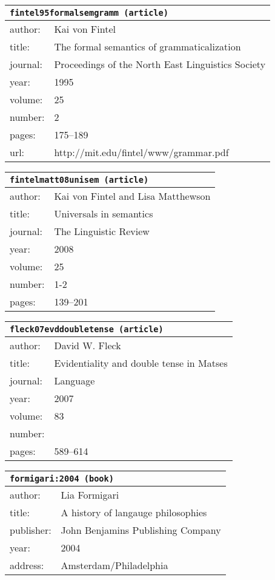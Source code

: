 \documentclass{article}
\begin{document}
\bigskip

\begin{tabular}{p{}p{}}
\multicolumn{2}{l}{\texttt{fintel95formalsemgramm (article)}}\\
\hline
author: & Kai {von Fintel}\\
title: & The formal semantics of grammaticalization\\
journal: & Proceedings of the North East Linguistics Society\\
year: & 1995\\
volume: & 25\\
number: & 2\\
pages: & 175--189\\
url: & http://mit.edu/fintel/www/grammar.pdf\\
\end{tabular}

\bigskip

\begin{tabular}{p{}p{}}
\multicolumn{2}{l}{\texttt{fintelmatt08unisem (article)}}\\
\hline
author: & Kai {von Fintel} and Lisa Matthewson\\
title: & Universals in semantics\\
journal: & The Linguistic Review\\
year: & 2008\\
volume: & 25\\
number: & 1-2\\
pages: & 139--201\\
\end{tabular}

\bigskip

\begin{tabular}{p{}p{}}
\multicolumn{2}{l}{\texttt{fleck07evddoubletense (article)}}\\
\hline
author: & David W. Fleck\\
title: & Evidentiality and double tense in Matses\\
journal: & Language\\
year: & 2007\\
volume: & 83\\
number: & \\
pages: & 589--614\\
\end{tabular}

\bigskip

\begin{tabular}{p{}p{}}
\multicolumn{2}{l}{\texttt{formigari:2004 (book)}}\\
\hline
author: & Lia Formigari\\
title: & A history of langauge philosophies\\
publisher: & John Benjamins Publishing Company\\
year: & 2004\\
address: & Amsterdam/Philadelphia\\
\end{tabular}
\end{document}
